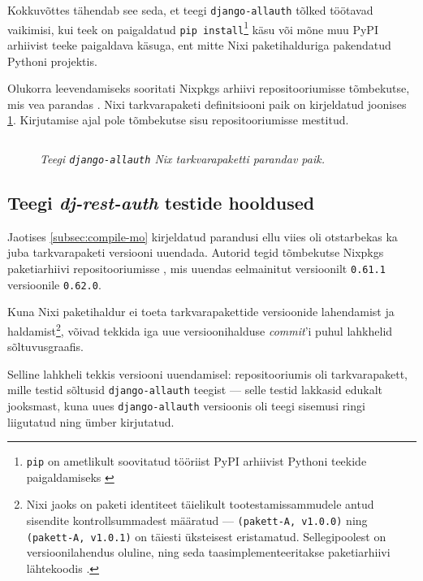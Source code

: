 Kokkuvõttes tähendab see seda, et teegi \texttt{django-allauth} tõlked töötavad vaikimisi, kui teek on paigaldatud \texttt{pip install}\footnote{\texttt{pip} on ametlikult soovitatud tööriist PyPI arhiivist Pythoni teekide paigaldamiseks \cite{pip-standard}} käsu või mõne muu PyPI arhiivist teeke paigaldava käsuga, ent mitte Nixi paketihalduriga pakendatud Pythoni projektis.

Olukorra leevendamiseks sooritati Nixpkgs arhiivi repositooriumisse tõmbekutse, mis vea parandas \cite{nixpkgs-compile-mo}. Nixi tarkvarapaketi definitsiooni paik on kirjeldatud joonises \ref{fig:compile-mo-patch}. Kirjutamise ajal pole tõmbekutse sisu repositooriumisse mestitud. 

\begin{figure}
\inputminted[breaklines]{diff}{chapters/data/compile-mo.diff}
\caption{\emph{Teegi \texttt{django-allauth} Nix tarkvarapaketti parandav paik.}}\label{fig:compile-mo-patch}
\end{figure}
\clearpage

\subsection{Teegi \textit{dj-rest-auth} testide hooldused}

Jaotises \ref{subsec:compile-mo} kirjeldatud parandusi ellu viies oli otstarbekas ka juba tarkvarapaketi versiooni uuendada. Autorid tegid tõmbekutse Nixpkgs paketiarhiivi repositooriumisse \cite{allauth-bump-nixpkgs}, mis uuendas eelmainitut versioonilt \texttt{0.61.1} versioonile \texttt{0.62.0}.

Kuna Nixi paketihaldur ei toeta tarkvarapakettide versioonide lahendamist ja haldamist\footnote{Nixi jaoks on paketi identiteet täielikult tootestamissammudele antud sisendite kontrollsummadest määratud \cite{nixos-how-nix-works} — \texttt{(pakett-A, v1.0.0)} ning \texttt{(pakett-A, v1.0.1)} on täiesti üksteisest eristamatud. Sellegipoolest on versioonilahendus oluline, ning seda taasimplementeeritakse paketiarhiivi lähtekoodis \cite{python3-nix-versioning}.}, võivad tekkida iga uue versioonihalduse \emph{commit}'i puhul lahkhelid sõltuvusgraafis.

Selline lahkheli tekkis versiooni uuendamisel: repositooriumis oli tarkvarapakett, mille testid sõltusid \texttt{django-allauth} teegist \cite{test-dep} — selle testid lakkasid edukalt jooksmast, kuna uues \texttt{django-allauth} versioonis oli teegi sisemusi ringi liigutatud ning ümber kirjutatud.

